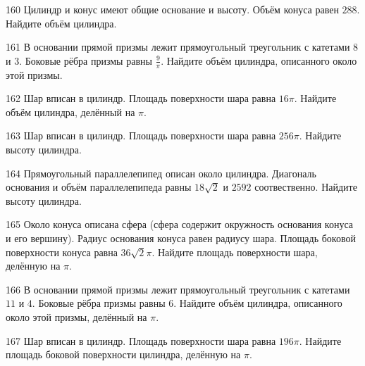 \documentclass[4apaper]{article}
\begin{document}
\begin{taskBN}{160}
Цилиндр и конус имеют общие основание и высоту. Объём конуса равен $288$. Найдите объём цилиндра.
\end{taskBN}

\begin{taskBN}{161}
В основании прямой призмы лежит прямоугольный треугольник с катетами $8$ и $3$. Боковые рёбра призмы равны $\frac{9}{\pi}$. Найдите объём цилиндра, описанного около этой призмы.
\end{taskBN}

\begin{taskBN}{162}
Шар вписан в цилиндр. Площадь поверхности шара равна $16\pi$. Найдите объём цилиндра, делённый на $\pi$.
\end{taskBN}

\begin{taskBN}{163}
Шар вписан в цилиндр. Площадь поверхности шара равна $256\pi$. Найдите высоту цилиндра.
\end{taskBN}

\begin{taskBN}{164}
Прямоугольный параллелепипед описан около цилиндра. Диагональ основания и объём параллелепипеда равны $18\sqrt{2}$ и $2592$ соотвественно. Найдите высоту цилиндра.
\end{taskBN}

\begin{taskBN}{165}
Около конуса описана сфера (сфера содержит окружность основания конуса и его вершину).  Радиус основания конуса равен радиусу шара. Площадь боковой поверхности конуса равна $36\sqrt{2}\pi$. Найдите площадь поверхности шара, делённую на $\pi$.
\end{taskBN}

\begin{taskBN}{166}
В основании прямой призмы лежит прямоугольный треугольник с катетами $11$ и $4$. Боковые рёбра призмы равны $6$. Найдите объём цилиндра, описанного около этой призмы, делённый на $\pi$.
\end{taskBN}

\begin{taskBN}{167}
Шар вписан в цилиндр. Площадь поверхности шара равна $196\pi$. Найдите площадь боковой поверхности цилиндра, делённую на $\pi$.
\end{taskBN}
\end{document}

